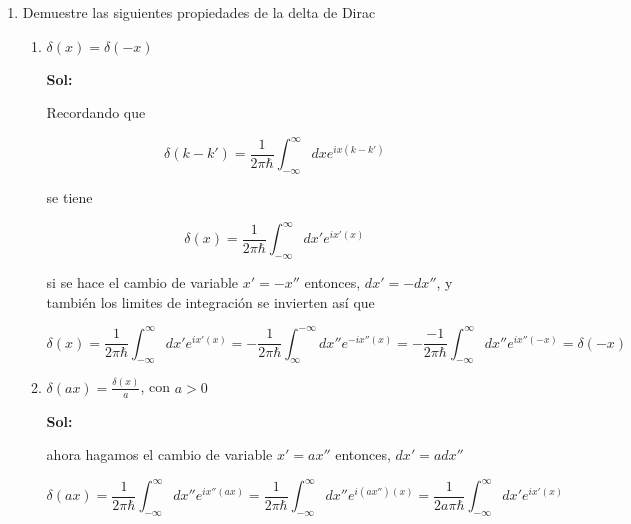 \documentclass[12pt,a4paper]{article}
\begin{document}
\begin{enumerate}
    
    
    
    
    
    
    
    \item Demuestre las siguientes propiedades de la delta de Dirac
    
    \begin{enumerate}
        \item $\delta (x) = \delta(-x)$ 
        
        \textbf{Sol:}
        
        Recordando que 
        
        \begin{equation*}
           \delta(k-k') = \frac{1}{2\pi \hbar} \int_{-\infty}^{\infty} dx e^{ix(k-k')}
        \end{equation*}
        
        se tiene
        
        \begin{equation*}
            \delta(x) = \frac{1}{2\pi \hbar} \int_{-\infty}^{\infty} dx' e^{ix'(x)}
        \end{equation*}
        
        si se  hace el cambio de variable $x' = -x''$ entonces, $dx' = -dx''$, y también los limites de integración se invierten así que
        
        \begin{equation*}
            \delta(x) = \frac{1}{2\pi \hbar} \int_{-\infty}^{\infty} dx' e^{ix'(x)} = -\frac{1}{2\pi \hbar} \int_{\infty}^{-\infty} dx'' e^{-ix''(x)} = -\frac{-1}{2\pi \hbar} \int_{-\infty}^{\infty} dx'' e^{ix''(-x)}  = \delta (-x)
        \end{equation*}
        
        \item $\delta (ax) = \frac{\delta(x)}{a}$, con $a>0$
        
        \textbf{Sol:}
        
        ahora hagamos el cambio de variable $x' = ax''$ entonces, $dx' = adx''$
        
        \begin{equation*}
            \delta(ax) = \frac{1}{2\pi \hbar} \int_{-\infty}^{\infty} dx'' e^{ix''(ax)} = \frac{1}{2\pi \hbar} \int_{-\infty}^{\infty} dx'' e^{i(ax'')(x)} = \frac{1}{2a\pi \hbar} \int_{-\infty}^{\infty} dx' e^{ix'(x)}
        \end{equation*}
        

\end{enumerate}
\end{enumerate}
\end{document}
